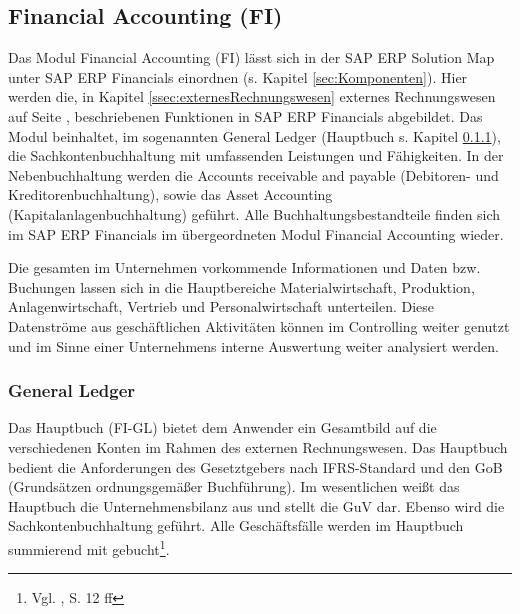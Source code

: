 \subsection{Financial Accounting (FI)} %
Das Modul Financial Accounting (FI) lässt sich in der SAP ERP Solution Map unter SAP ERP Financials einordnen (s. Kapitel \ref{sec:Komponenten}). 
Hier werden die, in Kapitel \ref{ssec:externesRechnungswesen} externes Rechnungswesen auf Seite \pageref{ssec:externesRechnungswesen}, beschriebenen Funktionen in SAP ERP Financials abgebildet. Das Modul beinhaltet, im sogenannten General Ledger (Hauptbuch s. Kapitel \ref{sec:gl}), die Sachkontenbuchhaltung mit umfassenden Leistungen und Fähigkeiten. In der Nebenbuchhaltung werden die Accounts receivable and payable (Debitoren- und Kreditorenbuchhaltung), sowie das Asset Accounting (Kapitalanlagenbuchhaltung) geführt. 
Alle Buchhaltungsbestandteile finden sich im SAP ERP Financials im übergeordneten Modul Financial Accounting wieder. 

Die gesamten im Unternehmen vorkommende Informationen und Daten bzw. Buchungen lassen sich in die Hauptbereiche Materialwirtschaft, Produktion, Anlagenwirtschaft, Vertrieb und Personalwirtschaft unterteilen. Diese Datenströme aus geschäftlichen Aktivitäten können im Controlling weiter genutzt und im Sinne einer Unternehmens interne Auswertung weiter analysiert werden.

\subsubsection{General Ledger} \label{sec:gl}%

Das Hauptbuch (FI-GL) bietet dem Anwender ein Gesamtbild auf die verschiedenen Konten im Rahmen des externen Rechnungswesen. Das Hauptbuch bedient die Anforderungen des Gesetztgebers nach IFRS-Standard und den GoB (Grundsätzen ordnungsgemäßer Buchführung). Im wesentlichen weißt das Hauptbuch die Unternehmensbilanz aus und stellt die GuV dar. Ebenso wird die Sachkontenbuchhaltung geführt. Alle Geschäftsfälle werden im Hauptbuch summierend mit gebucht\footnote{Vgl. \cite{SAPFIGL}, S. 12 ff}. 

